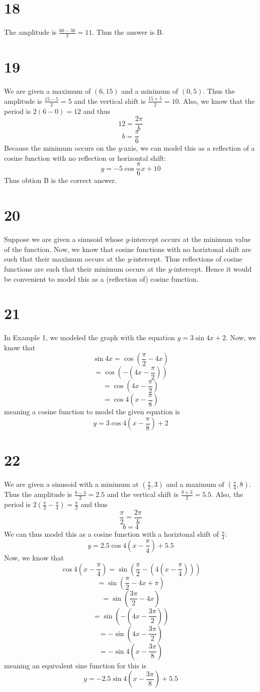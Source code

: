 \documentclass{article}
\theoremstyle{definition}
\newcommand{\?}{\stackrel{?}{=}}
\begin{document}
\section*{18}
The amplitude is $\frac{60-38}{2}=11$. Thus the answer is B. 

\section*{19}
We are given a maximum of $(6,15)$ and a minimum of $(0,5)$. Thus the amplitude is $\frac{15-5}{2}=5$ and the vertical shift is $\frac{15+5}{2}=10$. Also, we know that the period is
$2(6-0)=12$ and thus \[ 12=\frac{2\pi}{b} \] \[ b=\frac{\pi}{6} \] Because the minimum occurs on the $y$-axis, we can model this as a reflection of a cosine function with no reflection or horizontal shift:
\[ y=-5\cos\frac{\pi}{6}x+10 \]
Thus obtion B is the correct answer.

\section*{20}
Suppose we are given a sinusoid whose $y$-intercept occurs at the minimum value of the function. Now, we know that cosine functions with no horiztonal shift are such that their maximum occurs at the $y$-intercept. 
Thus reflections of cosine functions are such that their minimum occurs at the $y$-intercept. Hence it would be convenient to model this as a (reflection of) cosine function.

\section*{21}
In Example 1, we modeled the graph with the equation $y=3\sin 4x+2$. Now, we know that
\[ \sin 4x=\cos(\frac{\pi}{2}-4x) \]
\[ =\cos(-(4x-\frac{\pi}{2})) \]
\[ =\cos(4x-\frac{\pi}{2}) \]
\[ =\cos 4(x-\frac{\pi}{8}) \]
meaning a cosine function to model the given equation is
\[ y=3\cos 4(x-\frac{\pi}{8})+2 \]

\section*{22}
We are given a sinusoid with a minimum at $(\frac{\pi}{2},3)$ and a maximum of $(\frac{\pi}{4},8)$. Thus the amplitude is $\frac{8-3}{2}=2.5$ and the vertical shift is 
$\frac{8+3}{2}=5.5$. Also, the period is $2(\frac{\pi}{2}-\frac{\pi}{4})=\frac{\pi}{2}$ and thus \[ \frac{\pi}{2}=\frac{2\pi}{b} \] \[ b=4 \] We can thus model this as a cosine function with a horiztonal shift of 
$\frac{\pi}{4}$:
\[ y=2.5\cos 4(x-\frac{\pi}{4})+5.5 \]
Now, we know that
\[ \cos 4(x-\frac{\pi}{4})=\sin(\frac{\pi}{2}-(4(x-\frac{\pi}{4}))) \]
\[ =\sin(\frac{\pi}{2}-4x+\pi) \]
\[ =\sin(\frac{3\pi}{2}-4x) \]
\[ =\sin(-(4x-\frac{3\pi}{2})) \]
\[ =-\sin(4x-\frac{3\pi}{2}) \]
\[ =-\sin 4(x-\frac{3\pi}{8}) \]
meaning an equivalent sine function for this is
\[ y=-2.5\sin 4(x-\frac{3\pi}{8})+5.5 \]
\end{document}
